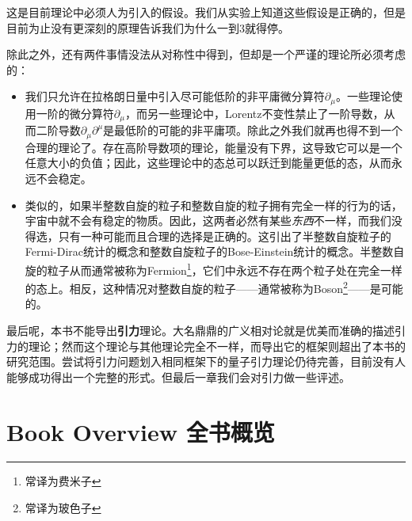 这是目前理论中必须人为引入的假设。我们从实验上知道这些假设是正确的，但是目前为止没有更深刻的原理告诉我们为什么一到$3$就得停。

除此之外，还有两件事情没法从对称性中得到，但却是一个严谨的理论所必须考虑的：

\begin{itemize}
\item 我们只允许在拉格朗日量中引入尽可能低阶的非平庸微分算符$\partial_\mu$。一些理论使用一阶的微分算符$\partial_\mu$，而另一些理论中，Lorentz不变性禁止了一阶导数，从而二阶导数$\partial_\mu\partial^\mu$是最低阶的可能的非平庸项。除此之外我们就再也得不到一个合理的理论了。存在高阶导数项的理论，能量没有下界，这导致它可以是一个任意大小的负值；因此，这些理论中的态总可以跃迁到能量更低的态，从而永远不会稳定。
\item 类似的，如果半整数自旋的粒子和整数自旋的粒子拥有完全一样的行为的话，宇宙中就不会有稳定的物质。因此，这两者必然有某些{\itshape 东西}不一样，而我们没得选，只有一种可能而且合理的选择是正确的。这引出了半整数自旋粒子的Fermi-Dirac统计的概念和整数自旋粒子的Bose-Einstein统计的概念。半整数自旋的粒子从而通常被称为Fermion\footnote{常译为费米子}，它们中永远不存在两个粒子处在完全一样的态上。相反，这种情况对整数自旋的粒子——通常被称为Boson\footnote{常译为玻色子}——是可能的。
\end{itemize}

最后呢，本书不能导出{\bfseries 引力}理论。大名鼎鼎的广义相对论就是优美而准确的描述引力的理论；然而这个理论与其他理论完全不一样，而导出它的框架则超出了本书的研究范围。尝试将引力问题划入相同框架下的量子引力理论仍待完善，目前没有人能够成功得出一个完整的形式。但最后一章我们会对引力做一些评述。

\section[全书概览]{Book Overview 全书概览}\label{sec1.2}

\begin{center}
\end{center}

